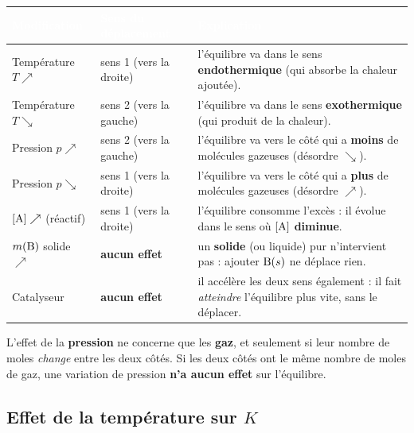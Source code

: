 \documentclass[11pt,a4paper]{article}
\begin{document}
\renewcommand{\arraystretch}{1.45}
\begin{center}
\begin{tabular}{|>{\centering\arraybackslash}m{3.5cm}|>{\centering\arraybackslash}m{4.3cm}|>{\raggedright\arraybackslash}m{6.3cm}|}
\hline
\rowcolor{primary!85}\textcolor{white}{\textbf{Modification}} &
\textcolor{white}{\textbf{Sens du déplacement}} &
\textcolor{white}{\textbf{Explication}}\\
\hline
\rowcolor{primary!6} Température $T \nearrow$ & sens 1 (vers la droite) &
   l'équilibre va dans le sens \textbf{endothermique} (qui absorbe la chaleur ajoutée).\\
\hline
 Température $T \searrow$ & sens 2 (vers la gauche) &
   l'équilibre va dans le sens \textbf{exothermique} (qui produit de la chaleur).\\
\hline
\rowcolor{primary!6} Pression $p \nearrow$ & sens 2 (vers la gauche) &
   l'équilibre va vers le côté qui a \textbf{moins} de molécules gazeuses (désordre $\searrow$).\\
\hline
 Pression $p \searrow$ & sens 1 (vers la droite) &
   l'équilibre va vers le côté qui a \textbf{plus} de molécules gazeuses (désordre $\nearrow$).\\
\hline
\rowcolor{primary!6} $[\ce{A}] \nearrow$ (réactif) & sens 1 (vers la droite) &
   l'équilibre consomme l'excès : il évolue dans le sens où $[\ce{A}]$ \textbf{diminue}.\\
\hline
 $m(\ce{B})$ solide $\nearrow$ & \textbf{aucun effet} &
   un \textbf{solide} (ou liquide) pur n'intervient pas : ajouter $\ce{B}(s)$ ne déplace rien.\\
\hline
 Catalyseur & \textbf{aucun effet} &
   il accélère les deux sens également : il fait \emph{atteindre} l'équilibre plus vite, sans le déplacer.\\
\hline
\end{tabular}
\end{center}
\renewcommand{\arraystretch}{1.0}

\begin{attention}
L'effet de la \textbf{pression} ne concerne que les \textbf{gaz}, et seulement si leur nombre de moles
\emph{change} entre les deux côtés. Si les deux côtés ont le même nombre de moles de gaz, une variation
de pression \textbf{n'a aucun effet} sur l'équilibre.
\end{attention}

\subsection{Effet de la température sur $K$}
\end{document}
